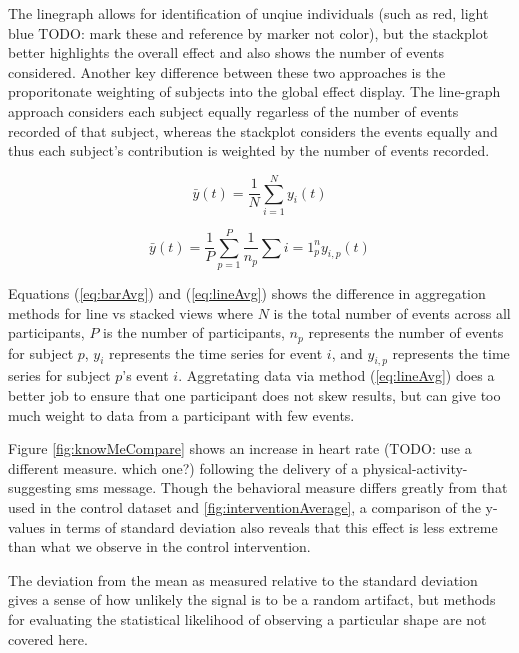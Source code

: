 The linegraph allows for identification of unqiue individuals (such as red, light blue TODO: mark these and reference by marker not color), but the stackplot better highlights the overall effect and also shows the number of events considered.
Another key difference between these two approaches is the proporitonate weighting of subjects into the global effect display.
The line-graph approach considers each subject equally regarless of the number of events recorded of that subject, whereas the stackplot considers the events equally and thus each subject's contribution is weighted by the number of events recorded.

\begin{equation}
	\bar{y}(t) = \frac{1}{N} \sum\limits_{i=1}^N y_i(t)
	\label{eq:barAvg}
\end{equation}

\begin{equation}
	\bar{y}(t) = \frac{1}{P} \sum\limits_{p=1}^P \frac{1}{n_p} \sum\limits{i=1}^n_p y_{i,p}(t)
	\label{eq:lineAvg}
\end{equation}
	
Equations (\ref{eq:barAvg}) and (\ref{eq:lineAvg}) shows the difference in aggregation methods for line vs stacked views where $N$ is the total number of events across all participants, $P$ is the number of participants, $n_p$ represents the number of events for subject $p$,  $y_i$ represents the time series for event $i$, and $y_{i,p}$ represents the time series for subject $p$'s event $i$.
Aggretating data via method (\ref{eq:lineAvg}) does a better job to ensure that one participant does not skew results, but can give too much weight to data from a participant with few events.

Figure \ref{fig:knowMeCompare} shows an increase in heart rate (TODO: use a different measure. which one?) following the delivery of a physical-activity-suggesting sms message.
Though the behavioral measure differs greatly from that used in the control dataset and \ref{fig:interventionAverage}, a comparison of the y-values in terms of standard deviation also reveals that this effect is less extreme than what we observe in the control intervention.

The deviation from the mean as measured relative to the standard deviation gives a sense of how unlikely the signal is to be a random artifact, but methods for evaluating the statistical likelihood of observing a particular shape are not covered here.

